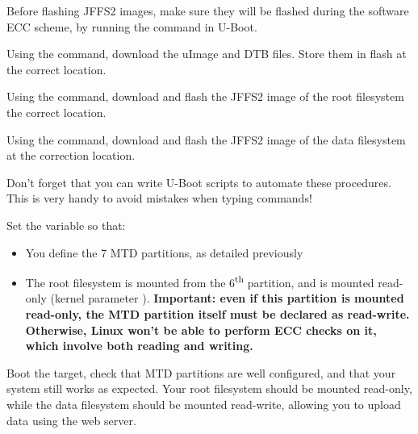Before flashing JFFS2 images, make sure they will be flashed during
the software ECC scheme, by running the  command in
U-Boot.

Using the  command, download the uImage and DTB files.
Store them in flash at the correct location.

Using the  command, download and flash the JFFS2 image
of the root filesystem the correct location.

Using the  command, download and flash the JFFS2 image of the
data filesystem at the correction location.

Don't forget that you can write U-Boot scripts to automate these
procedures. This is very handy to avoid mistakes when typing commands!

Set the  variable so that:

\begin{itemize}
\item You define the 7 MTD partitions, as detailed previously
\item The root filesystem is mounted from the 6\textsuperscript{th}
  partition, and is mounted read-only (kernel parameter ).
  {\bf Important: even if this partition is mounted read-only, the
  MTD partition itself must be declared as read-write. Otherwise,
  Linux won't be able to perform ECC checks on it, which involve
  both reading and writing.}
\end{itemize}

Boot the target, check that MTD partitions are well configured, and
that your system still works as expected. Your root filesystem should
be mounted read-only, while the data filesystem should be mounted
read-write, allowing you to upload data using the web server.
